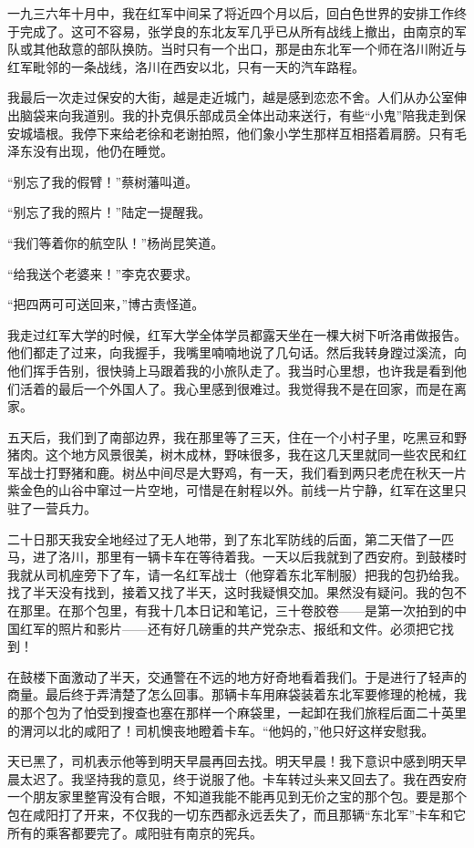 \documentclass[10pt]{book}
\begin{document}
一九三六年十月中，我在红军中间呆了将近四个月以后，回白色世界的安排工作终于完成了。这可不容易，张学良的东北友军几乎已从所有战线上撤出，由南京的军队或其他敌意的部队换防。当时只有一个出口，那是由东北军一个师在洛川附近与红军毗邻的一条战线，洛川在西安以北，只有一天的汽车路程。

我最后一次走过保安的大街，越是走近城门，越是感到恋恋不舍。人们从办公室伸出脑袋来向我道别。我的扑克俱乐部成员全体出动来送行，有些“小鬼”陪我走到保安城墙根。我停下来给老徐和老谢拍照，他们象小学生那样互相搭着肩膀。只有毛泽东没有出现，他仍在睡觉。

“别忘了我的假臂！”蔡树藩叫道。

“别忘了我的照片！”陆定一提醒我。

“我们等着你的航空队！”杨尚昆笑道。

“给我送个老婆来！”李克农要求。

“把四两可可送回来，”博古责怪道。

我走过红军大学的时候，红军大学全体学员都露天坐在一棵大树下听洛甫做报告。他们都走了过来，向我握手，我嘴里喃喃地说了几句话。然后我转身蹚过溪流，向他们挥手告别，很快骑上马跟着我的小旅队走了。我当时心里想，也许我是看到他们活着的最后一个外国人了。我心里感到很难过。我觉得我不是在回家，而是在离家。

五天后，我们到了南部边界，我在那里等了三天，住在一个小村子里，吃黑豆和野猪肉。这个地方风景很美，树木成林，野味很多，我在这几天里就同一些农民和红军战士打野猪和鹿。树丛中间尽是大野鸡，有一天，我们看到两只老虎在秋天一片紫金色的山谷中窜过一片空地，可惜是在射程以外。前线一片宁静，红军在这里只驻了一营兵力。

二十日那天我安全地经过了无人地带，到了东北军防线的后面，第二天借了一匹马，进了洛川，那里有一辆卡车在等待着我。一天以后我就到了西安府。到鼓楼时我就从司机座旁下了车，请一名红军战士（他穿着东北军制服）把我的包扔给我。找了半天没有找到，接着又找了半天，这时我疑惧交加。果然没有疑问。我的包不在那里。在那个包里，有我十几本日记和笔记，三十卷胶卷——是第一次拍到的中国红军的照片和影片——还有好几磅重的共产党杂志、报纸和文件。必须把它找到！

在鼓楼下面激动了半天，交通警在不远的地方好奇地看着我们。于是进行了轻声的商量。最后终于弄清楚了怎么回事。那辆卡车用麻袋装着东北军要修理的枪械，我的那个包为了怕受到搜查也塞在那样一个麻袋里，一起卸在我们旅程后面二十英里的渭河以北的咸阳了！司机懊丧地瞪着卡车。“他妈的，”他只好这样安慰我。

天已黑了，司机表示他等到明天早晨再回去找。明天早晨！我下意识中感到明天早晨太迟了。我坚持我的意见，终于说服了他。卡车转过头来又回去了。我在西安府一个朋友家里整宵没有合眼，不知道我能不能再见到无价之宝的那个包。要是那个包在咸阳打了开来，不仅我的一切东西都永远丢失了，而且那辆“东北军”卡车和它所有的乘客都要完了。咸阳驻有南京的宪兵。
\end{document}
